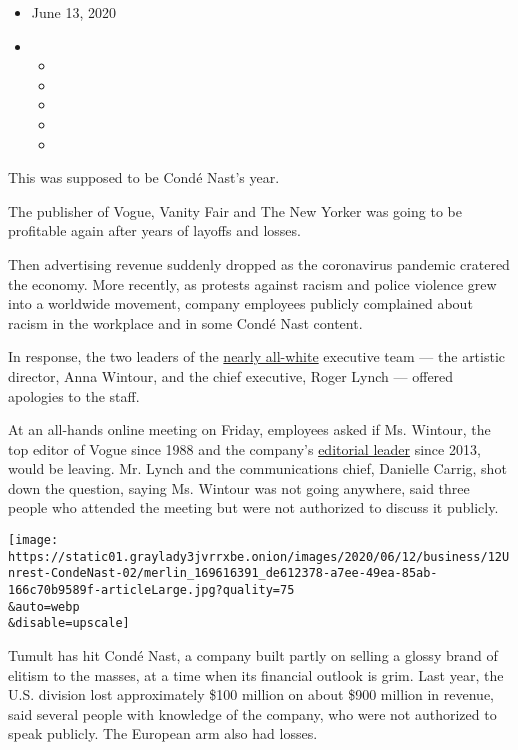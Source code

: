 \begin{itemize}
\item
  June 13, 2020
\item
  \begin{itemize}
  \item
  \item
  \item
  \item
  \item
  \end{itemize}
\end{itemize}

This was supposed to be Condé Nast's year.

The publisher of Vogue, Vanity Fair and The New Yorker was going to be
profitable again after years of layoffs and losses.

Then advertising revenue suddenly dropped as the coronavirus pandemic
cratered the economy. More recently, as protests against racism and
police violence grew into a worldwide movement, company employees
publicly complained about racism in the workplace and in some Condé Nast
content.

In response, the two leaders of the
\href{https://www.condenast.com/about\#our-executive-leadership-team}{nearly
all-white} executive team --- the artistic director, Anna Wintour, and
the chief executive, Roger Lynch --- offered apologies to the staff.

At an all-hands online meeting on Friday, employees asked if Ms.
Wintour, the top editor of Vogue since 1988 and the company's
\href{https://www.nytimes3xbfgragh.onion/2013/03/13/business/media/conde-nast-creates-new-job-for-anna-wintour.html}{editorial
leader} since 2013, would be leaving. Mr. Lynch and the communications
chief, Danielle Carrig, shot down the question, saying Ms. Wintour was
not going anywhere, said three people who attended the meeting but were
not authorized to discuss it publicly.

\texttt{[image: https://static01.graylady3jvrrxbe.onion/images/2020/06/12/business/12Unrest-CondeNast-02/merlin\_169616391\_de612378-a7ee-49ea-85ab-166c70b9589f-articleLarge.jpg?quality=75\\\&auto=webp\\\&disable=upscale]}

Tumult has hit Condé Nast, a company built partly on selling a glossy
brand of elitism to the masses, at a time when its financial outlook is
grim. Last year, the U.S. division lost approximately \$100 million on
about \$900 million in revenue, said several people with knowledge of
the company, who were not authorized to speak publicly. The European arm
also had losses.

